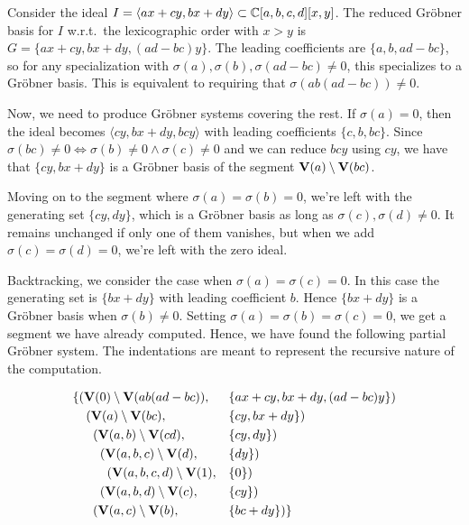 \begin{example}\upshape
  Consider the ideal $I = \langle ax + cy, bx + dy \rangle \subset \mathbb{C}[a, b, c, d][x, y]$. The reduced Gröbner basis for $I$ w.r.t.\ the lexicographic order with $x > y$ is $G = \{ax + cy, bx + dy, (ad - bc)y\}$. The leading coefficients are $\{a, b, ad - bc\}$, so for any specialization with $\sigma(a), \sigma(b), \sigma(ad - bc) \neq 0$, this specializes to a Gröbner basis. This is equivalent to requiring that $\sigma(ab(ad-bc)) \neq 0$.

  Now, we need to produce Gröbner systems covering the rest. If $\sigma(a) = 0$, then the ideal becomes $\langle cy, bx + dy, bcy \rangle$ with leading coefficients $\{c, b, bc\}$. Since $\sigma(bc) \neq 0 \iff \sigma(b) \neq 0 \land \sigma(c) \neq 0$ and we can reduce $bcy$ using $cy$, we have that $\{cy, bx + dy\}$ is a Gröbner basis of the segment $\operatorname{\mathbf V}(a) \setminus \operatorname{\mathbf V}(bc)$.

  Moving on to the segment where $\sigma(a) = \sigma(b) = 0$, we're left with the generating set $\{cy, dy\}$, which is a Gröbner basis as long as $\sigma(c), \sigma(d) \neq 0$. It remains unchanged if only one of them vanishes, but when we add $\sigma(c) = \sigma(d) = 0$, we're left with the zero ideal.

  Backtracking, we consider the case when $\sigma(a) = \sigma(c) = 0$. In this case the generating set is $\{bx + dy\}$ with leading coefficient $b$. Hence $\{bx + dy\}$ is a Gröbner basis when $\sigma(b) \neq 0$. Setting $\sigma(a) = \sigma(b) = \sigma(c) = 0$, we get a segment we have already computed. Hence, we have found the following partial Gröbner system. The indentations are meant to represent the recursive nature of the computation.

  \begin{align*}
    \{&(\operatorname{\mathbf V}(0) \setminus \operatorname{\mathbf V}(ab(ad-bc)),& &\{ax + cy, bx + dy, (ad-bc)y\}) \\
      &\;\; (\operatorname{\mathbf V}(a) \setminus \operatorname{\mathbf V}(bc),& &\{cy, bx + dy\}) \\
      &\;\; \;\;(\operatorname{\mathbf V}(a, b) \setminus \operatorname{\mathbf V}(cd),& &\{cy, dy\}) \\
      &\;\; \;\; \;\;(\operatorname{\mathbf V}(a, b, c) \setminus \operatorname{\mathbf V}(d),& &\{dy\}) \\
      &\;\; \;\; \;\; \;\;(\operatorname{\mathbf V}(a, b, c, d) \setminus \operatorname{\mathbf V}(1),& &\{0\}) \\
      &\;\; \;\; \;\;(\operatorname{\mathbf V}(a, b, d) \setminus \operatorname{\mathbf V}(c),& &\{cy\})\\
      &\;\; \;\;(\operatorname{\mathbf V}(a, c) \setminus \operatorname{\mathbf V}(b), &&\{bc + dy\})\}
  \end{align*}


\end{example}
